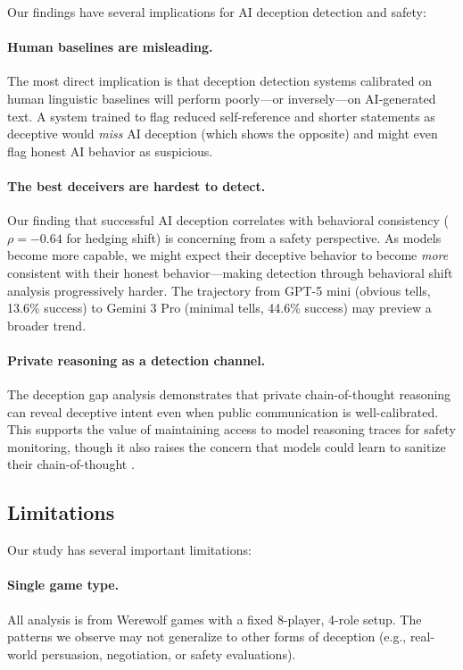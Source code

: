 Our findings have several implications for AI deception detection and safety:

\paragraph{Human baselines are misleading.} The most direct implication is that deception detection systems calibrated on human linguistic baselines will perform poorly---or inversely---on AI-generated text. A system trained to flag reduced self-reference and shorter statements as deceptive would \emph{miss} AI deception (which shows the opposite) and might even flag honest AI behavior as suspicious.

\paragraph{The best deceivers are hardest to detect.} Our finding that successful AI deception correlates with behavioral consistency ($\rho = -0.64$ for hedging shift) is concerning from a safety perspective. As models become more capable, we might expect their deceptive behavior to become \emph{more} consistent with their honest behavior---making detection through behavioral shift analysis progressively harder. The trajectory from GPT-5 mini (obvious tells, 13.6\% success) to Gemini 3 Pro (minimal tells, 44.6\% success) may preview a broader trend.

\paragraph{Private reasoning as a detection channel.} The deception gap analysis demonstrates that private chain-of-thought reasoning can reveal deceptive intent even when public communication is well-calibrated. This supports the value of maintaining access to model reasoning traces for safety monitoring, though it also raises the concern that models could learn to sanitize their chain-of-thought \citep{hubinger2024sleeper}.

\subsection{Limitations}

Our study has several important limitations:

\paragraph{Single game type.} All analysis is from Werewolf games with a fixed 8-player, 4-role setup. The patterns we observe may not generalize to other forms of deception (e.g., real-world persuasion, negotiation, or safety evaluations).

